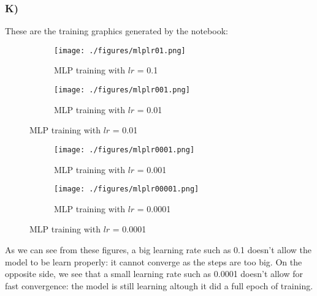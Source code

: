 \documentclass[12pt]{article}
\theoremstyle{definition}
\begin{document}
\subsubsection*{K)} These are the training graphics generated by the notebook:

\begin{figure}[H]
  \centering
  \begin{subfigure}[b]{0.45\textwidth}
    \centering
    \texttt{[image: ./figures/mlplr01.png]}
    \caption{MLP training with $lr$ = 0.1}
  \end{subfigure}
  \hfill
  \begin{subfigure}[b]{0.45\textwidth}
    \centering
    \texttt{[image: ./figures/mlplr001.png]}
    \caption{MLP training with $lr$ = 0.01}
  \end{subfigure}
\end{figure}

\begin{figure}[H]
  \centering
  \begin{subfigure}[b]{0.45\textwidth}
    \centering
    \texttt{[image: ./figures/mlplr0001.png]}
    \caption{MLP training with $lr$ = 0.001}
  \end{subfigure}
  \hfill
  \begin{subfigure}[b]{0.45\textwidth}
    \centering
    \texttt{[image: ./figures/mlplr00001.png]}
    \caption{MLP training with $lr$ = 0.0001}
  \end{subfigure}
\end{figure}
As we can see from these figures, a big learning rate such as 0.1 doesn't allow
the model to be learn properly: it cannot converge as the steps are too
big. On the opposite side, we see that a small learning rate such as 0.0001
doesn't allow for fast convergence: the model is still learning altough it did a
full epoch of training.
\end{document}

